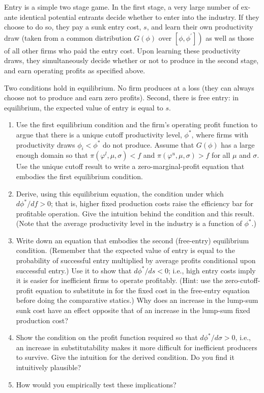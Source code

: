 \documentclass[10pt]{article}
\begin{document}
Entry is a simple two stage game. In the first stage, a very large number of ex-ante identical potential entrants decide whether to enter into the industry. If they choose to do so, they pay a sunk entry cost, $s$, and learn their own productivity draw (taken from a common distribution $G(\phi)$ over $\left.\left[\phi, \phi^{\prime}\right]\right)$ as well as those of all other firms who paid the entry cost. Upon learning these productivity draws, they simultaneously decide whether or not to produce in the second stage, and earn operating profits as specified above.

Two conditions hold in equilibrium. No firm produces at a loss (they can always choose not to produce and earn zero profits). Second, there is free entry: in equilibrium, the expected value of entry is equal to $s$.

\begin{enumerate}[label=\alph*.]
    \item Use the first equilibrium condition and the firm's operating profit function to argue that there is a unique cutoff productivity level, $\phi^*$, where firms with productivity draws $\phi_i<\phi^*$ do not produce. Assume that $G(\phi)$ has a large enough domain so that $\pi\left(\varphi^l, \mu, \sigma\right)<f$ and $\pi\left(\varphi^u, \mu, \sigma\right)>f$ for all $\mu$ and $\sigma$. Use the unique cutoff result to write a zero-marginal-profit equation that embodies the first equilibrium condition.
    \item Derive, using this equilibrium equation, the condition under which $d \phi^* / d f>0$; that is, higher fixed production costs raise the efficiency bar for profitable operation. Give the intuition behind the condition and this result. (Note that the average productivity level in the industry is a function of $\phi^*$.)
    \item Write down an equation that embodies the second (free-entry) 
        equilibrium condition. (Remember that the expected value of entry is equal 
        to the probability of successful entry multiplied by average profits 
        conditional upon successful entry.) Use it to show that $d \phi^* / d s<0$; 
        i.e., high entry costs imply it is easier for inefficient firms to operate 
        profitably. (Hint: use the zero-cutoff-profit equation to substitute in for 
        the fixed cost in the free-entry equation before doing the comparative statics.) Why does an increase in the lump-sum sunk cost have an effect opposite that of an increase in the lump-sum fixed production cost?
    \item Show the condition on the profit function required so that $d \phi^* / d \sigma>0$, i.e., an increase in substitutability makes it more difficult for inefficient producers to survive. Give the intuition for the derived condition. Do you find it intuitively plausible?
    \item How would you empirically test these implications?
\end{enumerate}

\hrulefill\hspace{0.5em}\dotfill\hspace{0.5em}\hrulefill
\end{document}
